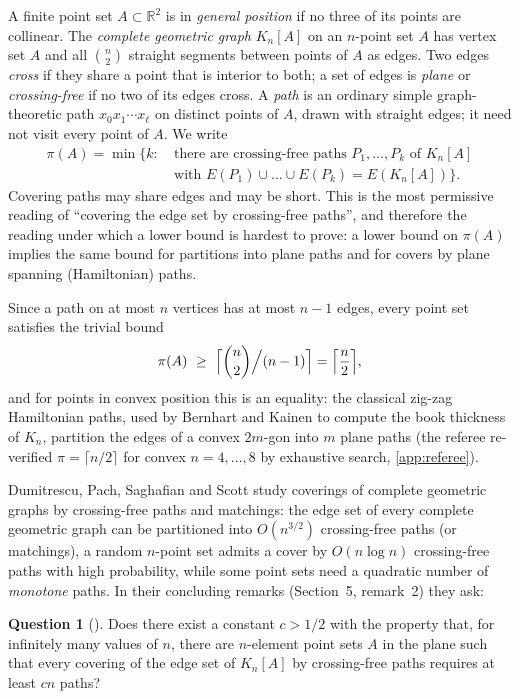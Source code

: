 \documentclass[11pt,a4paper]{article}
\theoremstyle{plain}
\theoremstyle{definition}
\newtheorem{question}[theorem]{Question}
\theoremstyle{remark}
\newcommand{\R}{\mathbb R}
\newcommand{\pipath}{\pi}
\begin{document}
A finite point set $A\subset\R^2$ is in \emph{general position} if no three of its points are collinear. The \emph{complete geometric graph} $K_n[A]$ on an $n$-point set $A$ has vertex set $A$ and all $\binom n2$ straight segments between points of $A$ as edges. Two edges \emph{cross} if they share a point that is interior to both; a set of edges is \emph{plane} or \emph{crossing-free} if no two of its edges cross. A \emph{path} is an ordinary simple graph-theoretic path $x_0x_1\cdots x_\ell$ on distinct points of $A$, drawn with straight edges; it need not visit every point of $A$. We write
\begin{align*}
 \pipath(A)=\min\bigl\{k:\ &\text{there are crossing-free paths }P_1,\dots,P_k\text{ of }K_n[A]\\
 &\text{with }E(P_1)\cup\dots\cup E(P_k)=E(K_n[A])\bigr\}.
\end{align*}
Covering paths may share edges and may be short. This is the most permissive reading of ``covering the edge set by crossing-free paths'', and therefore the reading under which a lower bound is hardest to prove: a lower bound on $\pipath(A)$ implies the same bound for partitions into plane paths and for covers by plane spanning (Hamiltonian) paths.

Since a path on at most $n$ vertices has at most $n-1$ edges, every point set satisfies the trivial bound
\begin{equation}\label{eq:trivial}
 \pipath(A)\ \ge\ \Bigl\lceil \binom n2\Big/(n-1)\Bigr\rceil=\Bigl\lceil\frac n2\Bigr\rceil ,
\end{equation}
and for points in convex position this is an equality: the classical zig-zag Hamiltonian paths, used by Bernhart and Kainen \cite{BK79} to compute the book thickness of $K_n$, partition the edges of a convex $2m$-gon into $m$ plane paths (the referee re-verified $\pipath=\lceil n/2\rceil$ for convex $n=4,\dots,8$ by exhaustive search, \cref{app:referee}).

Dumitrescu, Pach, Saghafian and Scott \cite{DPSS26} study coverings of complete geometric graphs by crossing-free paths and matchings: the edge set of every complete geometric graph can be partitioned into $O(n^{3/2})$ crossing-free paths (or matchings), a random $n$-point set admits a cover by $O(n\log n)$ crossing-free paths with high probability, while some point sets need a quadratic number of \emph{monotone} paths. In their concluding remarks (Section~5, remark~2) they ask:

\begin{question}[{\cite[Problem~9]{DPSS26}}]\label{q:main}
Does there exist a constant $c>1/2$ with the property that, for infinitely many values of $n$, there are $n$-element point sets $A$ in the plane such that every covering of the edge set of $K_{n}[A]$ by crossing-free paths requires at least $cn$ paths?
\end{question}
\end{document}
